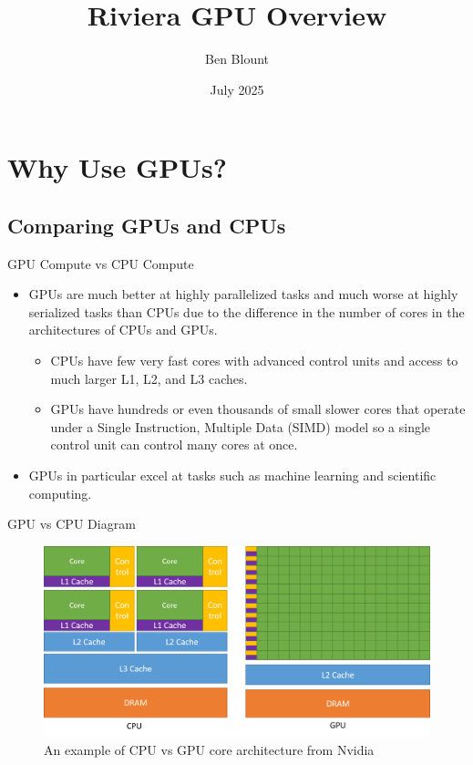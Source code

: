 \documentclass[aspectratio=169]{beamer}
\title{Riviera GPU Overview}
\author{Ben Blount}
\institute{Data Science Research Institute}
\date{July 2025}
\begin{document}
\maketitleframe

\section{Why Use GPUs?}

\subsection{Comparing GPUs and CPUs}
\begin{frame}{GPU Compute vs CPU Compute}
	\begin{itemize}
		\item GPUs are much better at highly parallelized tasks and much worse at highly serialized tasks than CPUs due to the difference in the number of cores in the architectures of CPUs and GPUs.
		      \begin{itemize}
			      \item CPUs have few very fast cores with advanced control units and access to much larger L1, L2, and L3 caches. 
            \item GPUs have hundreds or even thousands of small slower cores that operate under a Single Instruction, Multiple Data (SIMD) model so a single control unit can control many cores at once. 
		      \end{itemize}
		\item GPUs in particular excel at tasks such as machine learning and scientific computing.
	\end{itemize}
\end{frame}

\begin{frame}{GPU vs CPU Diagram}
	\begin{figure}
		\centering
		\includegraphics[scale=.4]{figures/gpu-vs-cpu.png}
    \caption{An example of CPU vs GPU core architecture from Nvidia}
	\end{figure}
\end{frame}
\end{document}
